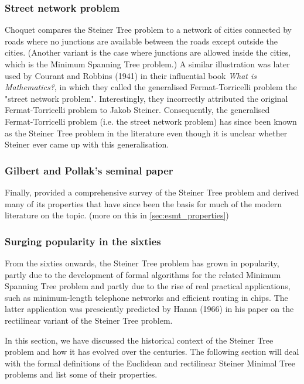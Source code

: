 \documentclass{l4proj}
\begin{document}
\subsubsection{Street network problem}
Choquet compares the Steiner Tree problem to a network of cities connected by roads where no junctions are available between the roads except outside the cities. (Another variant is the case where junctions are allowed inside the cities, which is the Minimum Spanning Tree problem.)
A similar illustration was later used by Courant and Robbins (1941) in their influential book \textit{What is Mathematics?}, in which they called the generalised Fermat-Torricelli problem the "street network problem". Interestingly, they incorrectly attributed the original Fermat-Torricelli problem to Jakob Steiner. Consequently, the generalised Fermat-Torricelli problem (i.e. the street network problem) has since been known as the Steiner Tree problem in the literature even though it is unclear whether Steiner ever came up with this generalisation.

\subsubsection{Gilbert and Pollak's seminal paper}
Finally, \cite{Gilbert1968SteinerMT} provided a comprehensive survey of the Steiner Tree problem and derived many of its properties that have since been the basis for much of the modern literature on the topic. (more on this in \ref{sec:esmt_properties})

\subsubsection{Surging popularity in the sixties}
From the sixties onwards, the Steiner Tree problem has grown in popularity, partly due to the development of formal algorithms for the related Minimum Spanning Tree problem and partly due to the rise of real practical applications, such as minimum-length telephone networks and efficient routing in chips. The latter application was presciently predicted by Hanan (1966) in his paper on the rectilinear variant of the Steiner Tree problem.

In this section, we have discussed the historical context of the Steiner Tree problem and how it has evolved over the centuries. The following section will deal with the formal definitions of the Euclidean and rectilinear Steiner Minimal Tree problems and list some of their properties.
\end{document}
